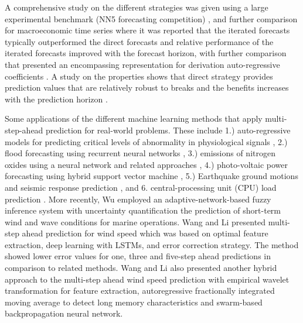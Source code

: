 \documentclass[final,5p,times,twocolumn]{elsarticle}
\begin{document}
 A  comprehensive study on  the  different strategies was given
using a large experimental
benchmark (NN5 forecasting competition) \cite{BenTaieb2012}, and further comparison for  macroeconomic time series where it 
was reported that the  iterated forecasts
typically outperformed the direct forecasts \cite{marcellino2006} and relative performance of the iterated forecasts improved with the
forecast horizon, with further  comparison that  presented  an encompassing 
representation for  derivation  auto-regressive coefficients  
 \cite{Proietti2011}. A study on the properties  
shows that direct strategy provides prediction values that are relatively robust 
to breaks and the benefits increases with the prediction horizon \cite{Chevillon2016}.
 





 
 






 Some applications of the different machine learning methods that apply multi-step-ahead prediction for  real-world 
problems. These  include 1.)  auto-regressive models   for    predicting critical levels of abnormality in 
physiological
signals \cite{TranCyber2016}, 2.) flood forecasting 
using  recurrent neural networks \cite{Chen2013Flood,Chang2014}, 3.) emissions of 
nitrogen oxides using a neural network and related approaches 
\cite{Smrekar2013Nox}, 4.) photo-voltaic power forecasting using hybrid support 
vector machine  \cite{DeGiorgi2016}, 5.) Earthquake ground motions
and seismic response prediction \cite{Yang2016}, and 6.   central-processing unit (CPU) load prediction \cite{YANG20131257}. More recently, Wu \cite{WU2019} employed an adaptive-network-based fuzzy inference system  with uncertainty quantification  the prediction of short-term wind and wave conditions for marine operations. Wang and Li \cite{WANG2018429} presented multi-step ahead prediction for wind speed which was based on optimal feature extraction, deep learning with LSTMs, and error correction strategy. The method  showed lower error values for one, three and five-step ahead predictions in comparison to  related methods. Wang and Li \cite{WANG2019296} also presented another hybrid approach to the multi-step ahead wind speed prediction with empirical wavelet transformation for feature extraction,  autoregressive fractionally integrated moving average to detect long memory characteristics and  swarm-based   backpropagation neural network. 
\end{document}
